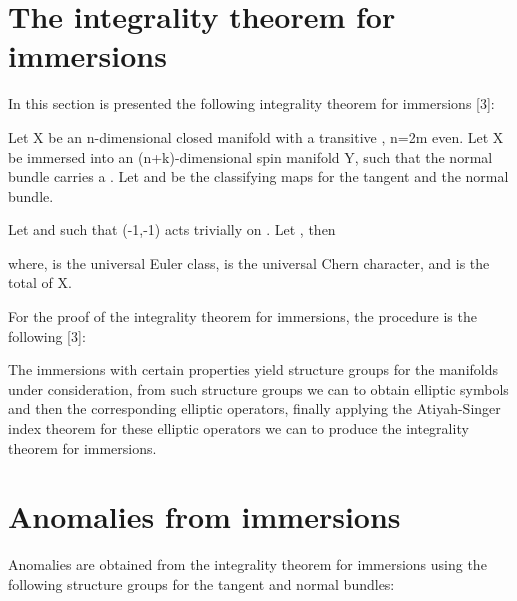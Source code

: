 \documentclass[a4paper,a4paper]{article}
\begin{document}
\section{The integrality theorem for immersions}
In this section is presented the following integrality theorem for immersions [3]:

Let X be an n-dimensional closed manifold with a transitive \coordHE{}, n=2m
even. Let X be immersed into an  (n+k)-dimensional spin manifold Y, such that the
normal bundle \myHighlight{$\nu$}\coordHE{} carries a \coordHE{}. Let \coordHE{}  and \coordHE{} be the classifying
maps for the tangent and the normal bundle.

Let \coordHE{} and \coordHE{} such
that (-1,-1) acts trivially on \coordHE{}.  Let  \coordHE{}, then

\begin{center}
\setlength{\baselineskip}{40pt}
 {  \coordHE{}
}
\end{center}
where, \coordHE{} is the universal Euler class, \coordHE{} is the universal Chern character, and \coordHE{} is the total
\coordHE{} of X.

For the proof of the integrality theorem for immersions, the procedure is the
following [3]:

The immersions with certain properties yield structure groups for the manifolds under
consideration, from such structure groups we can to obtain elliptic symbols and then
the corresponding elliptic operators, finally applying the Atiyah-Singer index theorem
for these elliptic operators we can to produce the integrality theorem for immersions.

\section{Anomalies from immersions}

Anomalies are obtained from the integrality theorem for immersions using the following
structure groups for the tangent and normal bundles:
\end{document}

